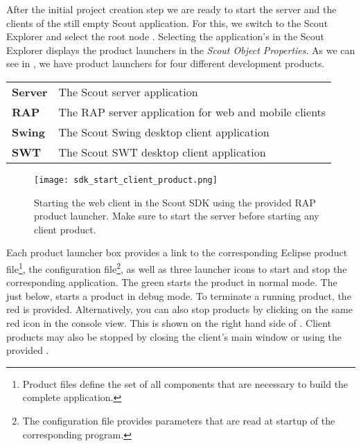 %

After the initial project creation step we are ready to start the server and the clients of the still empty Scout application.
For this, we switch to the Scout Explorer and select the root node .
Selecting the application's  in the Scout Explorer displays the product launchers in the \textit{Scout Object Properties}.
As we can see in , we have product launchers for four different development products.

\begin{tabular}{ l l }
  \textbf{Server} & The Scout server application\\
  \textbf{RAP}    & The RAP server application for web and mobile clients\\
  \textbf{Swing}  & The Scout Swing desktop client application\\
  \textbf{SWT}    & The Scout SWT desktop client application\\
\end{tabular}

\begin{figure}
\texttt{[image: sdk\_start\_client\_product.png]} 
\caption{Starting the web client in the Scout SDK using the provided RAP product launcher. Make sure to start the server before starting any client product.}
\end{figure}

Each product launcher box provides a link to the corresponding Eclipse product file\footnote{
Product files define the set of all components that are necessary to build the complete application.
},
the configuration file\footnote{
The configuration file  provides parameters that are read at startup of the corresponding program.
},
as well as three launcher icons to start and stop the corresponding application.
The green  starts the product in normal mode.
The  just below, starts a product in debug mode.
To terminate a running product, the red  is provided. 
Alternatively, you can also stop products by clicking on the same red icon in the console view.
This is shown on the right hand side of .
Client products may also be stopped by closing the client's main window or using the provided .

